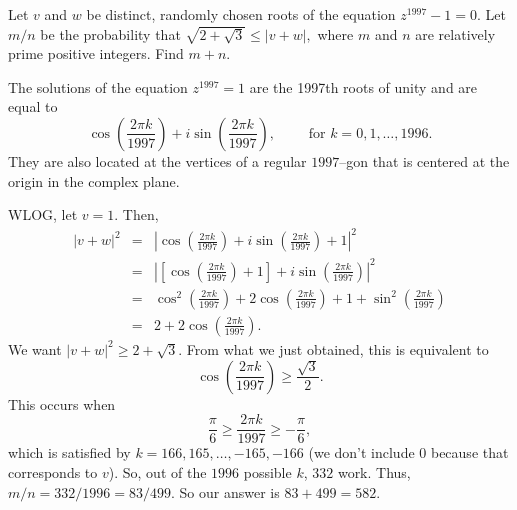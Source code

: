 \documentclass[11pt]{article}
\theoremstyle{definition}
\begin{document}
%	













\begin{question}[name={1997 AIME, \href{https://artofproblemsolving.com/community/c4p393661}{Problem 14}}]
	Let $v$ and $w$ be distinct, randomly chosen roots of the equation $z^{1997}-1=0.$ Let $m/n$ be the probability that $\sqrt{2+\sqrt{3}}\le |v+w|,$ where $m$ and $n$ are relatively prime positive integers. Find $m+n.$	
\end{question}


\begin{solution}[name={Solution by joml88}]
	The solutions of the equation $z^{1997}=1$ are the 1997th roots of unity and are equal to $$\cos\left(\frac{2\pi k}{1997}\right)+i\sin\left(\frac{2\pi k}{1997}\right),\qquad \text{ for } k=0,1,\dots,1996.$$ They are also located at the vertices of a regular $1997$--gon that is centered at the origin in the complex plane.
	
	WLOG, let $v=1.$ Then,
	\begin{eqnarray*} |v+w|^2 &=& |\cos\left(\frac{2\pi k}{1997}\right)+i\sin\left(\frac{2\pi k}{1997}\right)+1|^2\\ &=& \left|\left[\cos\left(\frac{2\pi k}{1997}\right)+1\right]+i\sin\left(\frac{2\pi k}{1997}\right)\right|^2\\ &=& \cos^2\left(\frac{2\pi k}{1997}\right)+2\cos\left(\frac{2\pi k}{1997}\right)+1+\sin^2\left(\frac{2\pi k}{1997}\right)\\ &=& 2+2\cos\left(\frac{2\pi k}{1997}\right). \end{eqnarray*}
	We want $|v+w|^2\ge 2+\sqrt{3}$. From what we just obtained, this is equivalent to $$\cos\left(\frac{2\pi k}{1997}\right)\ge \frac{\sqrt{3}}2.$$ This occurs when $$\frac{\pi}6\ge \frac{2\pi k}{1997}\ge -\frac{\pi}6,$$ which is satisfied by $k=166,165,\ldots,-165,-166$ (we don't include $0$ because that corresponds to $v$). So, out of the $1996$ possible $k$, $332$ work. Thus, $m/n=332/1996=83/499.$ So our answer is $83+499=\boxed{582}$.
\end{solution}
\end{document}
